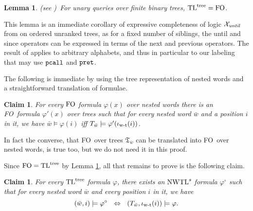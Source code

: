 \documentclass{LMCS}
\newcommand{\w}{{\bar{w}}}
\newcommand{\T}{\mathfrak{T}}
\newcommand{\FO}{{\rm FO}}
\renewcommand{\phi}{\varphi}
\newcommand{\wt}{\iota_{\text{\rm w-t}}}
\newcommand{\crc}[1]{#1^\circ}
\theoremstyle{plain}
\newtheorem{lemma}[theorem]{Lemma}
\newtheorem{claim}[theorem]{Claim}
\theoremstyle{definition}
\newcommand{\pret}{\tt{pret}}
\newcommand{\pcall}{\tt{pcall}}
\newcommand{\nwtls}{\nwtl^s}
\newcommand{\tltree}{\text{\rm TL}^{\text{\rm tree}}}
\begin{document}
{\begin{lemma}
\label{marx-lemma}
(see \cite{marx-pods04})\ For unary queries over finite binary trees,
$\tltree=\FO$.
\end{lemma}

This lemma is an immediate corollary of expressive completeness of
logic ${\mathcal X}_{\text{\it until}}$ from \cite{marx-pods04} on
ordered unranked trees, as for a fixed number of siblings, the until
and since operators can be expressed in terms of the next and previous
operators. The result of \cite{marx-pods04} applies to arbitrary
alphabets, and thus in particular to our labeling that may use
$\pcall$ and $\pret$.

The following is immediate by using the tree representation of nested
words and a straightforward
translation of formulae. 

\begin{claim}
\label{fo-to-fo-claim}
For every $\FO$ formula $\phi(x)$ over nested words there is an \FO\
formula $\phi'(x)$ over trees such that for every nested word $\w$ and
a position $i$ in it, we have $\w\models\phi(i)$ iff
$T_\w\models\phi'(\wt(i))$. 
\end{claim}


In fact the converse, that \FO\ over trees $\T_\w$ can be translated
into \FO\ over nested words, is true too, but we do not need it in this
proof.

Since $\FO=\tltree$ by Lemma \ref{marx-lemma}, all that remains to
prove is the following claim.

\begin{claim} 
\label{tltree-to-nwtl}
For every $\tltree$ formula $\phi$, there exists an $\nwtls$ formula
$\crc\phi$ such that for every nested word $\w$ and every position $i$
in it, we have 
$$(\w,i) \models \crc\phi \  \ \Leftrightarrow\ \ (T_\w,\wt(i))\models\phi.$$
\end{claim}

}
\end{document}
